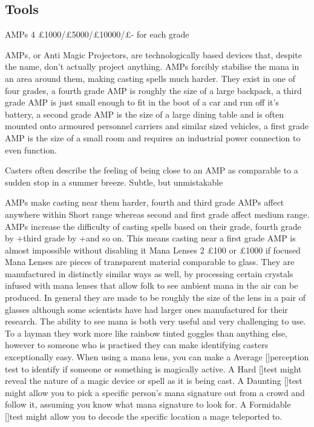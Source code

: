 \documentclass{article}
\newcommand\Average{Average [\Purple[2]]}
\newcommand\Hard{Hard [\Purple[3]]}
\newcommand\Daunting{Daunting [\Purple[4]]}
\newcommand\Formidable{Formidable [\Purple[5]]}
\begin{document}
\subsection{Tools}
\begin{multicols}{2}
\Equipment
{AMPs}
{4}
{£1000/£5000/£10000/£-  for each grade}
{AMPs, or Anti Magic Projectors, are technologically based devices that, despite the name, don't actually project anything. AMPs forcibly stabilise the mana in an area around them, making casting spells much harder. They exist in one of four grades, a fourth grade AMP is roughly the size of a large backpack, a third grade AMP is just small enough to fit in the boot of a car and run off it's battery, a second grade AMP is the size of a large dining table and is often mounted onto armoured personnel carriers and similar sized vehicles, a first grade AMP is the size of a small room and requires an industrial power connection to even function.\par Casters often describe the feeling of being close to an AMP as comparable to a sudden stop in a summer breeze. Subtle, but unmistakable}
{AMPs make casting near them harder, fourth and third grade AMPs affect anywhere within Short range whereas second and first grade affect medium range. AMPs increase the difficulty of casting spells based on their grade, fourth grade by +\Purple[1] third grade by +\Purple[2] and so on. This means casting near a first grade AMP is almost impossible without disabling it}
\Equipment
{Mana Lenses}
{2}
{£100 or £1000 if focused}
{Mana Lenses are pieces of transparent material comparable to glass. They are manufactured in distinctly similar ways as well, by processing certain crystals infused with mana lenses that allow folk to see ambient mana in the air can be produced. In general they are made to be roughly the size of the lens in a pair of glasses although some scientists have had larger ones manufactured for their research. The ability to see mana is both very useful and very challenging to use. To a layman they work more like rainbow tinted goggles than anything else, however to someone who is practised they can make identifying casters exceptionally easy.}
{When using a mana lens, you can make a \Average perception test to identify if someone or something is magically active. A \Hard test might reveal the nature of a magic device or spell as it is being cast. A \Daunting test might allow you to pick a specific person's mana signature out from a crowd and follow it, assuming you know what mana signature to look for. A \Formidable test might allow you to decode the specific location a mage teleported to.}
\end{multicols}
\end{document}
